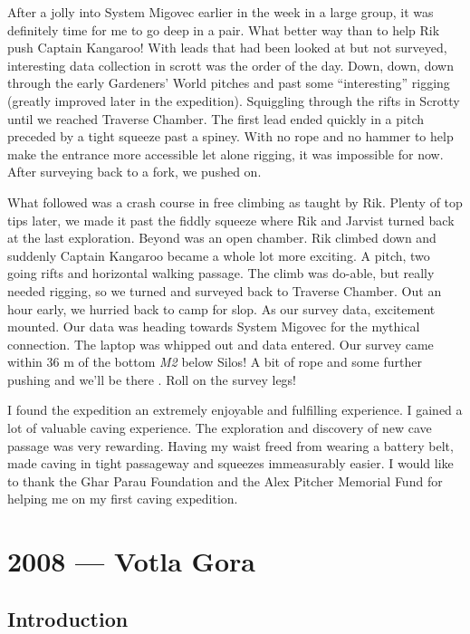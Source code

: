 After a jolly into System Migovec earlier in the week in a large group,
it was definitely time for me to go deep in a pair. What better way than
to help Rik push Captain Kangaroo! With leads that had been looked at
but not surveyed, interesting data collection in scrott was the order of
the day. Down, down, down through the early Gardeners' World pitches and
past some ``interesting'' rigging (greatly improved later in the
expedition). Squiggling through the rifts in Scrotty until we reached
Traverse Chamber. The first lead ended quickly in a pitch preceded by a
tight squeeze past a spiney. With no rope and no hammer to help make the
entrance more accessible let alone rigging, it was impossible for now.
After surveying back to a fork, we pushed on.

What followed was a crash course in free climbing as taught by Rik.
Plenty of top tips later, we made it past the fiddly squeeze where Rik
and Jarvist turned back at the last exploration. Beyond was an open
chamber. Rik climbed down and suddenly Captain Kangaroo became a whole
lot more exciting. A pitch, two going rifts and horizontal walking
passage. The climb was do-able, but really needed rigging, so we turned
and surveyed back to Traverse Chamber. Out an hour early, we hurried
back to camp for slop. As our survey data, excitement mounted. Our data
was heading towards System Migovec for the mythical connection. The
laptop was whipped out and data entered. Our survey came within 36 m of
the bottom \emph{M2} below Silos! A bit of rope and some further pushing
and we'll be there . Roll on the survey legs!

I found the expedition an extremely enjoyable and fulfilling experience.
I gained a lot of valuable caving experience. The exploration and
discovery of new cave passage was very rewarding. Having my waist freed
from wearing a battery belt, made caving in tight passageway and
squeezes immeasurably easier. I would like to thank the Ghar Parau
Foundation and the Alex Pitcher Memorial Fund for helping me on my first
caving expedition.


\hypertarget{votla-gora}{%
\chapter{2008 --- Votla Gora}\label{votla-gora}}

\hypertarget{introduction-1}{%
\section{Introduction}\label{introduction-1}}

